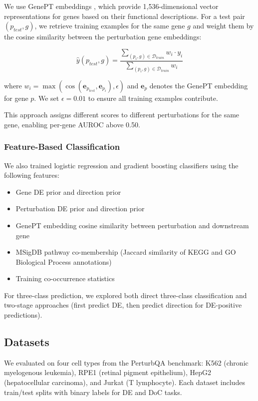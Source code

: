 \documentclass[11pt]{article}
\begin{document}
We use GenePT embeddings \citep{chen2023genept}, which provide 1,536-dimensional vector representations for genes based on their functional descriptions. For a test pair $(p_{test}, g)$, we retrieve training examples for the same gene $g$ and weight them by the cosine similarity between the perturbation gene embeddings:

\begin{equation}
\hat{y}(p_{test}, g) = \frac{\sum_{(p_i, g) \in \mathcal{D}_{train}} w_i \cdot y_i}{\sum_{(p_i, g) \in \mathcal{D}_{train}} w_i}
\end{equation}

where $w_i = \max(\cos(\mathbf{e}_{p_{test}}, \mathbf{e}_{p_i}), \epsilon)$ and $\mathbf{e}_p$ denotes the GenePT embedding for gene $p$. We set $\epsilon = 0.01$ to ensure all training examples contribute.

This approach assigns different scores to different perturbations for the same gene, enabling per-gene AUROC above 0.50.

\subsubsection{Feature-Based Classification}

We also trained logistic regression and gradient boosting classifiers using the following features:

\begin{itemize}
    \item Gene DE prior and direction prior
    \item Perturbation DE prior and direction prior
    \item GenePT embedding cosine similarity between perturbation and downstream gene
    \item MSigDB pathway co-membership (Jaccard similarity of KEGG and GO Biological Process annotations)
    \item Training co-occurrence statistics
\end{itemize}

For three-class prediction, we explored both direct three-class classification and two-stage approaches (first predict DE, then predict direction for DE-positive predictions).

\subsection{Datasets}

We evaluated on four cell types from the PerturbQA benchmark: K562 (chronic myelogenous leukemia), RPE1 (retinal pigment epithelium), HepG2 (hepatocellular carcinoma), and Jurkat (T lymphocyte). Each dataset includes train/test splits with binary labels for DE and DoC tasks.
\end{document}
